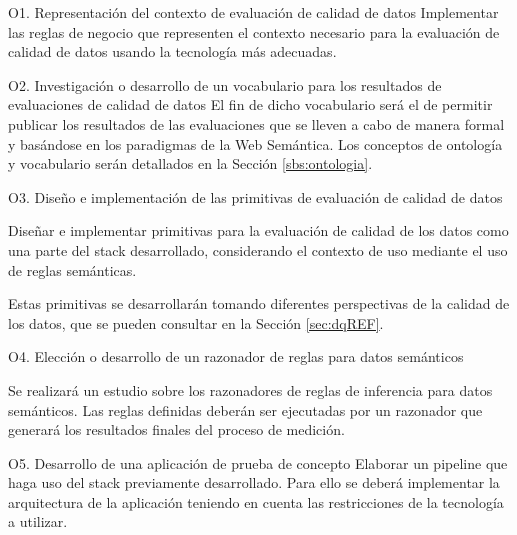 \begin{definitionlist}
\item[O1. Representación del contexto de evaluación de calidad de datos]
Implementar  las  reglas  de  negocio  que representen el contexto necesario
para la evaluación de
calidad  de datos usando la tecnología más adecuadas.
\label{sec:reglas}

\item[O2. Investigación o desarrollo de un vocabulario para los resultados
  de evaluaciones de calidad de datos]
El fin de dicho vocabulario será el de permitir publicar los
resultados de las evaluaciones que se lleven a cabo de manera formal y basándose
en los paradigmas de la Web Semántica. Los conceptos de ontología y vocabulario
serán detallados en la Sección \ref{sbs:ontologia}. 

\item[O3. Diseño e implementación de las primitivas de evaluación de calidad de datos]

Diseñar e implementar primitivas para la evaluación de calidad de los datos como
una parte del stack desarrollado, considerando el contexto de uso mediante el uso
de reglas semánticas.

Estas primitivas se desarrollarán tomando diferentes perspectivas de la calidad
de los datos, que se pueden consultar en la Sección \ref{sec:dqREF}. 


\item[O4. Elección o desarrollo de un razonador de reglas para datos semánticos]

Se realizará un estudio sobre los razonadores de reglas de inferencia para
datos semánticos. Las reglas definidas deberán ser
ejecutadas por un razonador que generará los resultados finales del proceso de
medición. 


\item[O5. Desarrollo de una aplicación de prueba de concepto]
Elaborar un pipeline que haga uso del stack 
previamente desarrollado. Para ello se deberá implementar la arquitectura de
la aplicación teniendo en cuenta las restricciones de la tecnología a utilizar.

\end{definitionlist}
